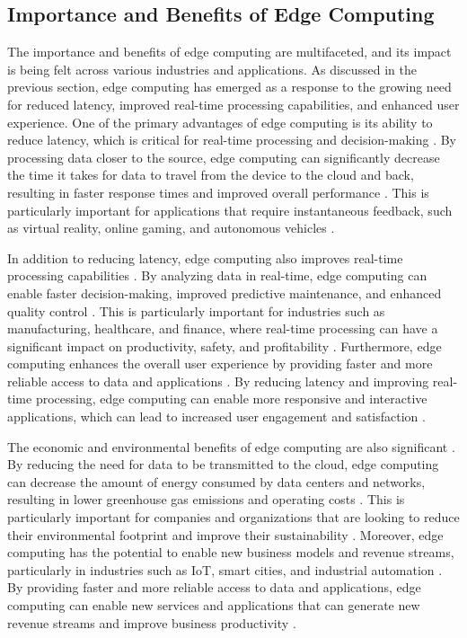 \documentclass[11pt]{article}
\begin{document}
\subsection{Importance and Benefits of Edge Computing}

The importance and benefits of edge computing are multifaceted, and its impact is being felt across various industries and applications. As discussed in the previous section, edge computing has emerged as a response to the growing need for reduced latency, improved real-time processing capabilities, and enhanced user experience. One of the primary advantages of edge computing is its ability to reduce latency, which is critical for real-time processing and decision-making \cite{ref2}. By processing data closer to the source, edge computing can significantly decrease the time it takes for data to travel from the device to the cloud and back, resulting in faster response times and improved overall performance \cite{ref8}. This is particularly important for applications that require instantaneous feedback, such as virtual reality, online gaming, and autonomous vehicles \cite{ref9}.

In addition to reducing latency, edge computing also improves real-time processing capabilities \cite{ref2}. By analyzing data in real-time, edge computing can enable faster decision-making, improved predictive maintenance, and enhanced quality control \cite{ref10}. This is particularly important for industries such as manufacturing, healthcare, and finance, where real-time processing can have a significant impact on productivity, safety, and profitability \cite{ref11}. Furthermore, edge computing enhances the overall user experience by providing faster and more reliable access to data and applications \cite{ref1}. By reducing latency and improving real-time processing, edge computing can enable more responsive and interactive applications, which can lead to increased user engagement and satisfaction \cite{ref12}.

The economic and environmental benefits of edge computing are also significant \cite{ref13}. By reducing the need for data to be transmitted to the cloud, edge computing can decrease the amount of energy consumed by data centers and networks, resulting in lower greenhouse gas emissions and operating costs \cite{ref1}. This is particularly important for companies and organizations that are looking to reduce their environmental footprint and improve their sustainability \cite{ref14}. Moreover, edge computing has the potential to enable new business models and revenue streams, particularly in industries such as IoT, smart cities, and industrial automation \cite{ref15}. By providing faster and more reliable access to data and applications, edge computing can enable new services and applications that can generate new revenue streams and improve business productivity \cite{ref1}.
\end{document}
